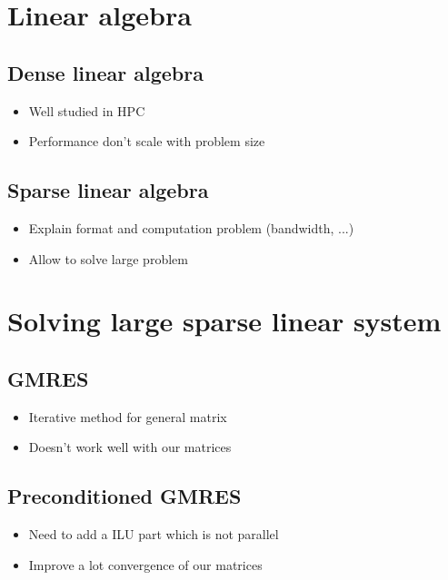 \documentclass[oneside,12t]{classes/Thesis}
\begin{document}
\section{Linear algebra}
\subsection{Dense linear algebra}
  \begin{itemize}
    \item Well studied in HPC
    \item Performance don't scale with problem size
  \end{itemize}
\subsection{Sparse linear algebra}
  \begin{itemize}
    \item Explain format and computation problem (bandwidth, ...)
    \item Allow to solve large problem
  \end{itemize}


\section{Solving large sparse linear system}
\subsection{GMRES}
  \begin{itemize}
    \item Iterative method for general matrix
    \item Doesn't work well with our matrices
  \end{itemize}
\subsection{Preconditioned GMRES}
  \begin{itemize}
    \item Need to add a ILU part which is not parallel
    \item Improve a lot convergence of our matrices
  \end{itemize}
\end{document}
